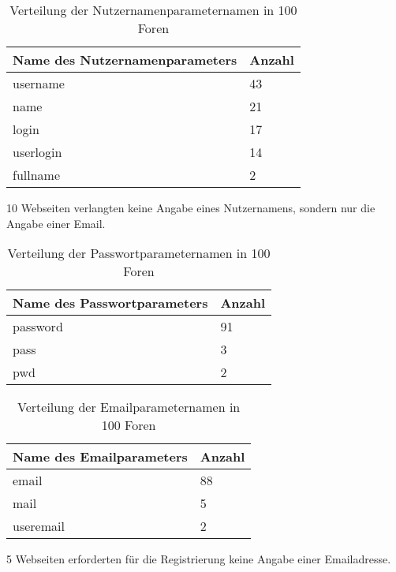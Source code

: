 
\begin{table}[h!]
\centering 
\begin{tabular}{ | p{7cm} | p{3cm}|} \hline
Name des Nutzernamenparameters & Anzahl \\ \hline
username & 43 \\ \hline
name & 21 \\ \hline
login & 17 \\ \hline
userlogin & 14 \\ \hline
fullname & 2 \\ \hline
\end{tabular}
\caption{Verteilung der Nutzernamenparameternamen in 100 Foren}
\end{table}

10 Webseiten verlangten keine Angabe eines Nutzernamens, sondern nur die Angabe einer Email.

\begin{table}[h!]
\centering 
\begin{tabular}{ | p{7cm} | p{3cm}|} \hline
Name des Passwortparameters & Anzahl \\ \hline
password & 91 \\ \hline
pass & 3 \\ \hline
pwd & 2 \\ \hline
\end{tabular}
\caption{Verteilung der Passwortparameternamen in 100 Foren}
\end{table}


\begin{table}[h!]
\centering 
\begin{tabular}{ | p{7cm} | p{3cm}|} \hline
Name des Emailparameters & Anzahl \\ \hline
email & 88 \\ \hline
mail & 5 \\ \hline
useremail & 2 \\ \hline
\end{tabular}
\caption{Verteilung der Emailparameternamen in 100 Foren}
\end{table}

5 Webseiten erforderten für die Registrierung keine Angabe einer Emailadresse.


